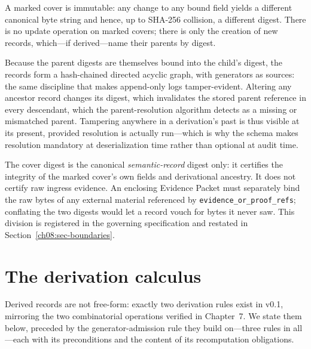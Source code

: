 \begin{invariant}[Immutability]\label{ch08:inv-immutable}
A marked cover is immutable: any change to any bound field yields a different canonical byte string and hence, up to SHA-256 collision, a different digest. There is no update operation on marked covers; there is only the creation of new records, which---if derived---name their parents by digest.
\end{invariant}

\begin{remark}\label{ch08:rem-chain}
Because the parent digests are themselves bound into the child's digest, the records form a hash-chained directed acyclic graph, with generators as sources: the same discipline that makes append-only logs tamper-evident. Altering any ancestor record changes its digest, which invalidates the stored parent reference in every descendant, which the parent-resolution algorithm detects as a missing or mismatched parent. Tampering anywhere in a derivation's past is thus visible at its present, provided resolution is actually run---which is why the schema makes resolution mandatory at deserialization time rather than optional at audit time.
\end{remark}

\begin{boundary}\label{ch08:boundary-digest-scope}
The cover digest is the canonical \emph{semantic-record} digest only: it certifies the integrity of the marked cover's own fields and derivational ancestry. It does not certify raw ingress evidence. An enclosing Evidence Packet must separately bind the raw bytes of any external material referenced by \texttt{evidence\_or\_proof\_refs}; conflating the two digests would let a record vouch for bytes it never saw. This division is registered in the governing specification and restated in Section~\ref{ch08:sec-boundaries}.
\end{boundary}

\section{The derivation calculus}\label{ch08:sec-derivation}

Derived records are not free-form: exactly two derivation rules exist in v0.1, mirroring the two combinatorial operations verified in Chapter~7. We state them below, preceded by the generator-admission rule they build on---three rules in all---each with its preconditions and the content of its recomputation obligations.

